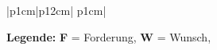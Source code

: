 \begin{table}[h]
\begin{tabular}{|p{1cm}|p{12cm}| p{1cm}|}


	\end{tabular}
	\begin{minipage}{0.5\linewidth}
		\small
		\textbf{Legende:} \textbf{F} = Forderung, \textbf{W} = Wunsch,
	\end{minipage}
	
\end{table}

